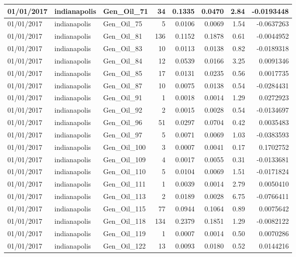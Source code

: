 \documentclass[
  letterpaper,
  DIV=11,
  numbers=noendperiod]{scrartcl}
\begin{document}
\begin{tabular}{l|l|l|r|r|r|r|r}
\hline
01/01/2017 & indianapolis & Gen\_Oil\_71 & 34 & 0.1335 & 0.0470 & 2.84 & -0.0193448\\
\hline
01/01/2017 & indianapolis & Gen\_Oil\_75 & 5 & 0.0106 & 0.0069 & 1.54 & -0.0637263\\
\hline
01/01/2017 & indianapolis & Gen\_Oil\_81 & 136 & 0.1152 & 0.1878 & 0.61 & -0.0044952\\
\hline
01/01/2017 & indianapolis & Gen\_Oil\_83 & 10 & 0.0113 & 0.0138 & 0.82 & -0.0189318\\
\hline
01/01/2017 & indianapolis & Gen\_Oil\_84 & 12 & 0.0539 & 0.0166 & 3.25 & 0.0091346\\
\hline
01/01/2017 & indianapolis & Gen\_Oil\_85 & 17 & 0.0131 & 0.0235 & 0.56 & 0.0017735\\
\hline
01/01/2017 & indianapolis & Gen\_Oil\_87 & 10 & 0.0075 & 0.0138 & 0.54 & -0.0284431\\
\hline
01/01/2017 & indianapolis & Gen\_Oil\_91 & 1 & 0.0018 & 0.0014 & 1.29 & 0.0272923\\
\hline
01/01/2017 & indianapolis & Gen\_Oil\_92 & 2 & 0.0015 & 0.0028 & 0.54 & -0.0134697\\
\hline
01/01/2017 & indianapolis & Gen\_Oil\_96 & 51 & 0.0297 & 0.0704 & 0.42 & 0.0035483\\
\hline
01/01/2017 & indianapolis & Gen\_Oil\_97 & 5 & 0.0071 & 0.0069 & 1.03 & -0.0383593\\
\hline
01/01/2017 & indianapolis & Gen\_Oil\_100 & 3 & 0.0007 & 0.0041 & 0.17 & 0.1702752\\
\hline
01/01/2017 & indianapolis & Gen\_Oil\_109 & 4 & 0.0017 & 0.0055 & 0.31 & -0.0133681\\
\hline
01/01/2017 & indianapolis & Gen\_Oil\_110 & 5 & 0.0104 & 0.0069 & 1.51 & -0.0171824\\
\hline
01/01/2017 & indianapolis & Gen\_Oil\_111 & 1 & 0.0039 & 0.0014 & 2.79 & 0.0050410\\
\hline
01/01/2017 & indianapolis & Gen\_Oil\_113 & 2 & 0.0189 & 0.0028 & 6.75 & -0.0766411\\
\hline
01/01/2017 & indianapolis & Gen\_Oil\_115 & 77 & 0.0944 & 0.1064 & 0.89 & 0.0075642\\
\hline
01/01/2017 & indianapolis & Gen\_Oil\_118 & 134 & 0.2379 & 0.1851 & 1.29 & -0.0082122\\
\hline
01/01/2017 & indianapolis & Gen\_Oil\_119 & 1 & 0.0007 & 0.0014 & 0.50 & 0.0070286\\
\hline
01/01/2017 & indianapolis & Gen\_Oil\_122 & 13 & 0.0093 & 0.0180 & 0.52 & 0.0144216\\

\end{tabular}
\end{document}
